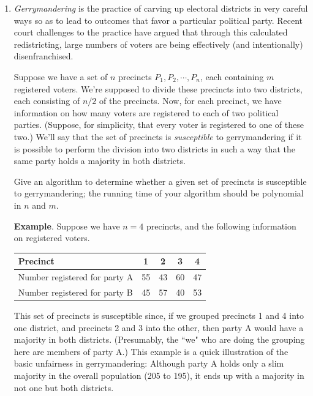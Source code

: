 \documentclass{article}
\begin{document}
\begin{enumerate}
\item \textit{Gerrymandering} is the practice of carving up electoral districts in very careful ways so as to lead to outcomes that favor a particular political party. Recent court challenges to the practice have argued that through this calculated redistricting, large numbers of voters are being effectively
(and intentionally) disenfranchised.

Suppose we have a set of $n$ precincts $P_1, P_2, \cdots, P_n$, each containing $m$ registered voters. We're supposed to divide these precincts into two districts, each consisting of $n/2$ of the precincts. Now, for each precinct, we have information on how many voters are registered to each of two
political parties. (Suppose, for simplicity, that every voter is registered to one of these two.) We'll say that the set of precincts is \textit{susceptible} to
gerrymandering if it is possible to perform the division into two districts in such a way that the same party holds a majority in both districts.

Give an algorithm to determine whether a given set of precincts is susceptible to gerrymandering; the running time of your algorithm
should be polynomial in $n$ and $m$. 

\textbf{Example}. Suppose we have $n = 4$ precincts, and the following information
on registered voters.

\begin{center}
  \begin{tabular}{ l | c | c | c | c }
    \hline
    Precinct & 1 & 2 & 3 & 4\\ \hline
    Number registered for party A & 55 & 43 & 60 & 47 \\ \hline
    Number registered for party B & 45 & 57 & 40 & 53 \\
    \hline
  \end{tabular}
\end{center}


This set of precincts is susceptible since, if we grouped precincts 1 and 4 into one district, and precincts 2 and 3 into the other, then party
A would have a majority in both districts. (Presumably, the ``we" who are doing the grouping here are members of party A.) This example is a quick illustration of the basic unfairness in gerrymandering: Although party A holds only a slim majority in the overall population (205 to 195), it ends up with a majority in not one but both districts.

\bigskip

\end{enumerate}
\end{document}
